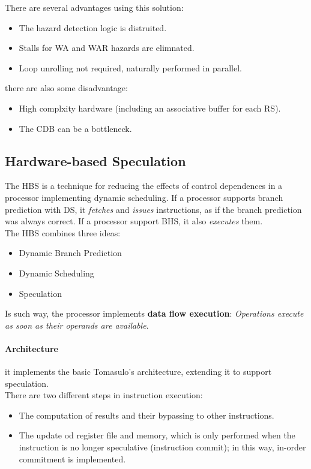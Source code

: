 \documentclass[12pt]{article}
\begin{document}
There are several advantages using this solution:
\begin{itemize}
  \item The hazard detection logic is distruited.
  \item Stalls for WA and WAR hazards are elimnated.
  \item Loop unrolling not required, naturally performed in parallel.
\end{itemize}
there are also some disadvantage:
\begin{itemize}
  \item High complxity hardware (including an associative buffer for each RS).
  \item The CDB can be a bottleneck.
\end{itemize}

\subsection{Hardware-based Speculation}
The HBS is a technique for reducing the effects of control dependences in a processor implementing dynamic scheduling. If a processor supports branch prediction with DS, it \textit{fetches} and \textit{issues} instructions, as if the branch prediction was always correct. If a processor support BHS, it also \textit{executes} them.\\
The HBS combines three ideas:
\begin{itemize}
  \item Dynamic Branch Prediction
  \item Dynamic Scheduling
  \item Speculation
\end{itemize}
Is such way, the processor implements \textbf{data flow execution}: \textit{Operations execute as soon as their operands are available}.\\

\paragraph{Architecture} it implements the basic Tomasulo's architecture, extending it to support speculation.\\
There are two different steps in instruction execution:
\begin{itemize}
  \item The computation of results and their bypassing to other instructions.
  \item The update od register file and memory, which is only performed when the instruction is no longer speculative (instruction commit); in this way, in-order commitment is implemented.
\end{itemize}
\end{document}
